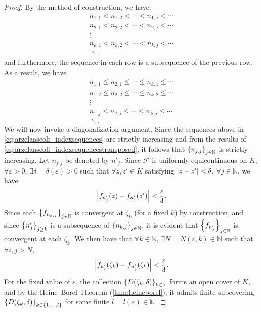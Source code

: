 \begin{proof}
    By the method of construction, we have:
    \begin{gather}
        n_{1,1}<n_{1,2}<\cdots<n_{1,j}\nonumber<\cdots\\
        n_{2,1}<n_{2,2}<\cdots<n_{2,j}\nonumber<\cdots\\
        \vdots\nonumber\\
        n_{k,1}<n_{k,2}<\cdots<n_{k,j}<\cdots\nonumber\\
        \ddots,\label{eq:arzelaascoli_indexsequences}
    \end{gather}
    and furthermore, the sequence in each row is a subsequence of the previous row. As a result, we have
    \begin{gather}
        n_{1,1}\leq n_{2,1}\leq \cdots\leq n_{k,1}\leq \cdots\nonumber\\
        n_{1,2}\leq n_{2,2}\leq \cdots\leq n_{k,2}\leq \cdots\nonumber\\
        \vdots\nonumber\\
        n_{1,j}\leq n_{2,j}\leq \cdots\leq n_{k,j}\leq \cdots\nonumber\\
        \ddots.\label{eq:arzelaascoli_indexsequencestransposed}
    \end{gather}
    We will now invoke a diagonalization argument. Since the sequences above in \cref{eq:arzelaascoli_indexsequences} are strictly increasing and from the results of \cref{eq:arzelaascoli_indexsequencestransposed}, it follows that \(\cbraces{n_{j,j}}_{j\in\mathbb{N}}\) is strictly increasing. Let \(n_{j,j}\) be denoted by \(n'_{j}\). Since \(\mathcal{F}\) is uniformly equicontinuous on \(K\), \(\forall\varepsilon>0\), \(\exists\delta=\delta(\varepsilon)>0\) such that \(\forall z,z'\in K\) satisfying \(\abs{z-z'}<\delta\), \(\forall j\in\mathbb{N}\), we have
    \begin{equation}
        \abs{f_{n'_j}(z)-f_{n'_j}(z')}<\frac{\varepsilon}{3}.\label{eq:arzelaascoli_uniformequicontinuitydirectconsequence}
    \end{equation} Since each \(\cbraces{f_{n_{k,j}}}_{j\in\mathbb{N}}\) is convergent at \(\zeta_k\) (for a fixed \(k\)) by construction, and since \(\cbraces{n'_j}_{j\geq k}\) is a subsequence of \(\cbraces{n_{k,j}}_{j\in\mathbb{N}}\), it is evident that \(\cbraces{f_{n'_j}}_{j\in\mathbb{N}}\) is convergent at each \(\zeta_k\). We then have that \(\forall k\in\mathbb{N}\), \(\exists N=N(\varepsilon,k)\in\mathbb{N}\) such that \(\forall i,j>N\), \[\abs{f_{n'_i}\qty(\zeta_k)-f_{n'_j}\qty(\zeta_k)}<\frac{\varepsilon}{3}.\]
    For the fixed value of \(\varepsilon\), the collection \(\cbraces{D\qty(\zeta_k,\delta)}_{k\in\mathbb{N}}\) forms an open cover of \(K\), and by the Heine--Borel Theorem (\cref{thm:heineborel}), it admits finite subcovering \(\cbraces{D\qty(\zeta_k,\delta)}_{k\in\cbraces{1,\ldots,l}}\) for some finite \(l=l(\varepsilon)\in\mathbb{N}\).


\end{proof}
